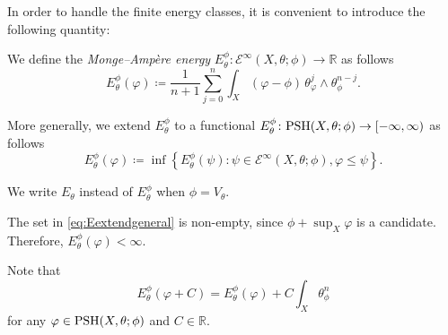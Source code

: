 In order to handle the finite energy classes, it is convenient to introduce the following quantity:
\begin{definition}\label{def:MAenergy}
    We define the \emph{Monge--Amp\`ere energy} $E^{\phi}_{\theta}\colon \mathcal{E}^{\infty}(X,\theta;\phi)\rightarrow \mathbb{R}$ as follows
    \begin{equation}\label{eq:Edefbdd}
        E^{\phi}_{\theta}(\varphi)\coloneqq \frac{1}{n+1}\sum_{j=0}^n \int_X (\varphi-\phi)\, \theta_{\varphi}^j\wedge \theta_{\phi}^{n-j}.
    \end{equation}


    More generally, we extend $E_{\theta}^{\phi}$ to a functional $E^{\phi}_{\theta}\colon \mathrm{PSH}(X,\theta;\phi)\rightarrow [-\infty,\infty)$ as follows
    \begin{equation}\label{eq:Eextendgeneral}
        E^{\phi}_{\theta}(\varphi)\coloneqq \inf\left\{E^{\phi}_{\theta}(\psi):\psi\in \mathcal{E}^{\infty}(X,\theta;\phi),\varphi\leq \psi\right\}.
    \end{equation}

     We write $E_{\theta}$ instead of $E_{\theta}^{\phi}$ when $\phi=V_{\theta}$.
\end{definition}
The set in \eqref{eq:Eextendgeneral} is non-empty, since $\phi+\sup_X \varphi$ is a candidate. Therefore, $E^{\phi}_{\theta}(\varphi)<\infty$.


Note that
\begin{equation}\label{eq:Ephiaddcst}
E^{\phi}_{\theta}(\varphi+C)=E^{\phi}_{\theta}(\varphi)+C\int_X \theta_{\phi}^n
\end{equation}
for any $\varphi\in \mathrm{PSH}(X,\theta;\phi)$ and $C\in \mathbb{R}$.



